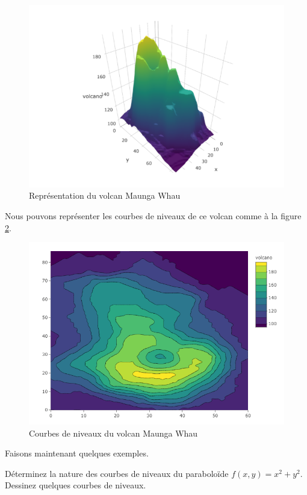 \documentclass[]{book}
\theoremstyle{definition}
\theoremstyle{definition}
\theoremstyle{definition}
\theoremstyle{remark}
\let\BeginKnitrBlock\begin \let\EndKnitrBlock\end
\begin{document}
\begin{figure}

{\centering \includegraphics[width=0.8\linewidth]{resources/images/volcano} 

}

\caption{Représentation du volcan Maunga Whau}\label{fig:volcano3d}
\end{figure}

Nous pouvons représenter les courbes de niveaux de ce volcan comme à la
figure \ref{fig:volcano2d}.

\begin{figure}

{\centering \includegraphics[width=0.8\linewidth]{resources/images/volcano-contour} 

}

\caption{Courbes de niveaux du volcan Maunga Whau}\label{fig:volcano2d}
\end{figure}

Faisons maintenant quelques exemples.

\BeginKnitrBlock{example}
\protect\hypertarget{exm:unnamed-chunk-127}{}{\label{exm:unnamed-chunk-127}
}Déterminez la nature des courbes de niveaux du paraboloïde
\(f(x,y)=x^2+y^2\). Dessinez quelques courbes de niveaux.
\EndKnitrBlock{example}
\vspace*{6cm}
\end{document}
